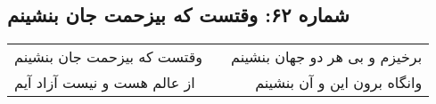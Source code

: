 \begin{center}
\section*{شماره ۶۲: وقتست که بیزحمت جان بنشینم}
\label{sec:062}
\begin{longtable}{l p{0.5cm} r}
وقتست که بیزحمت جان بنشینم
&&
برخیزم و بی هر دو جهان بنشینم
\\
از عالم هست و نیست آزاد آیم
&&
وانگاه برون این و آن بنشینم
\\
\end{longtable}
\end{center}
